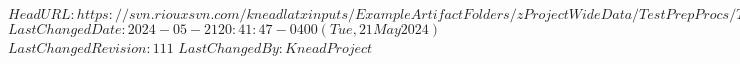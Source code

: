\svnidlong
{$HeadURL: https://svn.riouxsvn.com/kneadlatxinputs/ExampleArtifactFolders/zProjectWideData/TestPrepProcs/TestCasePost_AllRecords.tex $}
{$LastChangedDate: 2024-05-21 20:41:47 -0400 (Tue, 21 May 2024) $}
{$LastChangedRevision: 111 $}
{$LastChangedBy: KneadProject $}



